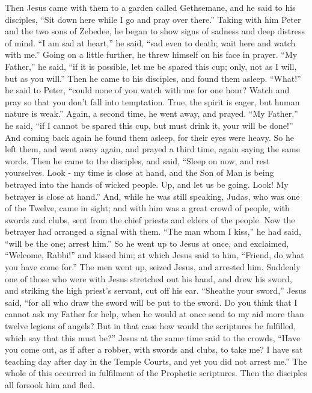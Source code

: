 Then Jesus came with them to a garden called Gethsemane,
and he said to his disciples, ``Sit down here while I go and pray over
there.''  Taking with him Peter and the two sons of
Zebedee, he began to show signs of sadness and deep distress of mind.
 ``I am sad at heart,'' he said, ``sad even to death; wait
here and watch with me.''  Going on a little further, he
threw himself on his face in prayer. ``My Father,'' he said, ``if it is
possible, let me be spared this cup; only, not as I will, but as you
will.''  Then he came to his disciples, and found them
asleep. ``What!'' he said to Peter, ``could none of you watch with me
for one hour?  Watch and pray so that you don't fall into
temptation. True, the spirit is eager, but human nature is weak.''
 Again, a second time, he went away, and prayed. ``My
Father,'' he said, ``if I cannot be spared this cup, but must drink it,
your will be done!''  And coming back again he found them
asleep, for their eyes were heavy.  So he left them, and
went away again, and prayed a third time, again saying the same words.
 Then he came to the disciples, and said, ``Sleep on now,
and rest yourselves. Look - my time is close at hand, and the Son of Man
is being betrayed into the hands of wicked people.  Up, and
let us be going. Look! My betrayer is close at hand.'' 
And, while he was still speaking, Judas, who was one of the Twelve, came
in sight; and with him was a great crowd of people, with swords and
clubs, sent from the chief priests and elders of the people.
 Now the betrayer had arranged a signal with them. ``The
man whom I kiss,'' he had said, ``will be the one; arrest him.''
 So he went up to Jesus at once, and exclaimed, ``Welcome,
Rabbi!'' and kissed him;  at which Jesus said to him,
``Friend, do what you have come for.'' The men went up, seized Jesus,
and arrested him.  Suddenly one of those who were with
Jesus stretched out his hand, and drew his sword, and striking the high
priest's servant, cut off his ear.  ``Sheathe your sword,''
Jesus said, ``for all who draw the sword will be put to the sword.
 Do you think that I cannot ask my Father for help, when he
would at once send to my aid more than twelve legions of angels?
 But in that case how would the scriptures be fulfilled,
which say that this must be?''  Jesus at the same time said
to the crowds, ``Have you come out, as if after a robber, with swords
and clubs, to take me? I have sat teaching day after day in the Temple
Courts, and yet you did not arrest me.''  The whole of this
occurred in fulfilment of the Prophetic scriptures. Then the disciples
all forsook him and fled.

